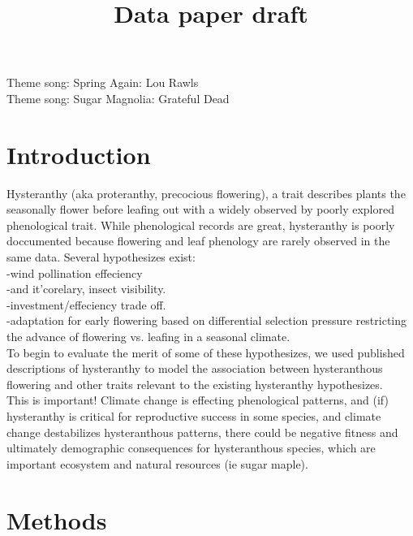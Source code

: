 \documentclass{article}\usepackage[]{graphicx}\usepackage[]{color}
\begin{document}
\title{Data paper draft}
Theme song: Spring Again: Lou Rawls\\
Theme song: Sugar Magnolia: Grateful Dead\\
\section*{Introduction}
Hysteranthy (aka proteranthy, precocious flowering), a trait describes plants the seasonally flower before leafing out with a widely observed by poorly explored phenological trait. While phenological records are great, hysteranthy is poorly doccumented because flowering and leaf phenology are rarely observed in the same data. Several hypothesizes exist:\\
-wind pollination effeciency \\
-and it'corelary, insect visibility.\\
-investment/effeciency trade off.\\
-adaptation for early flowering based on differential selection pressure restricting the advance of flowering vs. leafing in a seasonal climate.\\
To begin to evaluate the merit of some of these hypothesizes, we used published descriptions of hysteranthy to model the association between hysteranthous flowering and other traits relevant to the existing hysteranthy hypothesizes.\\
This is important! Climate change is effecting phenological patterns, and (if) hysteranthy is critical for reproductive success in some species, and climate change destabilizes hysteranthous patterns, there could be negative fitness and ultimately demographic consequences for hysteranthous species, which are important ecosystem and natural resources (ie sugar maple).

\section*{Methods}
\end{document}
